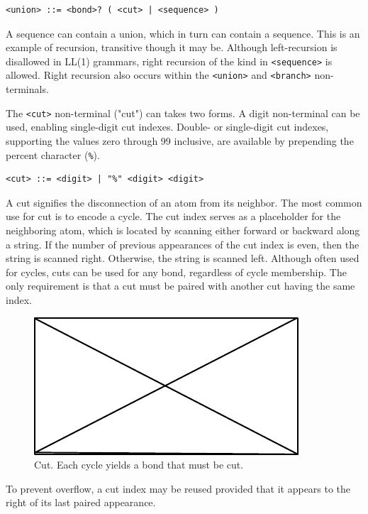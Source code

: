 \documentclass{article}
\def\ttt{\texttt}
\begin{document}
\begin{lstlisting}
<union> ::= <bond>? ( <cut> | <sequence> )
\end{lstlisting}

A sequence can contain a union, which in turn can contain a sequence. This is an example of recursion, transitive though it may be. Although left-recursion is disallowed in LL(1) grammars, right recursion of the kind in \ttt{<sequence>} is allowed. Right recursion also occurs within the \ttt{<union>} and \ttt{<branch>} non-terminals.

The \ttt{<cut>} non-terminal ("cut") can takes two forms. A digit non-terminal can be used, enabling single-digit cut indexes. Double- or single-digit cut indexes, supporting the values zero through 99 inclusive, are available by prepending the percent character (\ttt{\%}).

\begin{lstlisting}
<cut> ::= <digit> | "%" <digit> <digit>
\end{lstlisting}

A cut signifies the disconnection of an atom from its neighbor. The most common use for cut is to encode a cycle. The cut index serves as a placeholder for the neighboring atom, which is located by scanning either forward or backward along a string. If the number of previous appearances of the cut index is even, then the string is scanned right. Otherwise, the string is scanned left. Although often used for cycles, cuts can be used for any bond, regardless of cycle membership. The only requirement is that a cut must be paired with another cut having the same index.

\begin{figure}
    \centering
    \includegraphics{filler}
    \caption{Cut. Each cycle yields a bond that must be cut.}
    \label{fig:cut}
\end{figure}

To prevent overflow, a cut index may be reused provided that it appears to the right of its last paired appearance.
\end{document}
